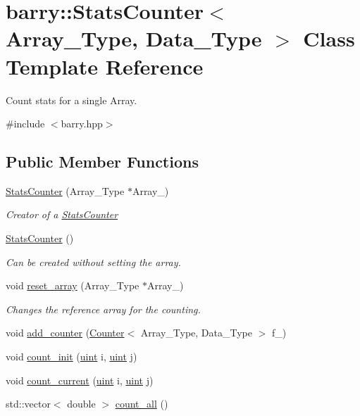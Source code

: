 \hypertarget{classbarry_1_1_stats_counter}{}\section{barry\+:\+:Stats\+Counter$<$ Array\+\_\+\+Type, Data\+\_\+\+Type $>$ Class Template Reference}
\label{classbarry_1_1_stats_counter}


Count stats for a single Array.  




{\ttfamily \#include $<$barry.\+hpp$>$}

\subsection*{Public Member Functions}
\begin{DoxyCompactItemize}
\item 
\hyperlink{classbarry_1_1_stats_counter_aab3d582ee9928340790bdd1b5b2d5f5b}{Stats\+Counter} (Array\+\_\+\+Type $\ast$Array\+\_\+)
\begin{DoxyCompactList}\small\item\em Creator of a {\ttfamily \hyperlink{classbarry_1_1_stats_counter}{Stats\+Counter}} \end{DoxyCompactList}\item 
\hyperlink{classbarry_1_1_stats_counter_a407df1580b207faac92c476c7062b840}{Stats\+Counter} ()
\begin{DoxyCompactList}\small\item\em Can be created without setting the array. \end{DoxyCompactList}\item 
void \hyperlink{classbarry_1_1_stats_counter_a38fd8037c34dff376d2e5fb013690642}{reset\+\_\+array} (Array\+\_\+\+Type $\ast$Array\+\_\+)
\begin{DoxyCompactList}\small\item\em Changes the reference array for the counting. \end{DoxyCompactList}\item 
void \hyperlink{classbarry_1_1_stats_counter_ad175dcd2bd30d017881783de546ac333}{add\+\_\+counter} (\hyperlink{classbarry_1_1_counter}{Counter}$<$ Array\+\_\+\+Type, Data\+\_\+\+Type $>$ f\+\_\+)
\item 
void \hyperlink{classbarry_1_1_stats_counter_a19bd5936619e190c0d8918b4f343922e}{count\+\_\+init} (\hyperlink{namespacebarry_a11dfc53ddb4672278319aa04f1e09a6c}{uint} i, \hyperlink{namespacebarry_a11dfc53ddb4672278319aa04f1e09a6c}{uint} j)
\item 
void \hyperlink{classbarry_1_1_stats_counter_ab81166f7cb67eeaecc469016d237019a}{count\+\_\+current} (\hyperlink{namespacebarry_a11dfc53ddb4672278319aa04f1e09a6c}{uint} i, \hyperlink{namespacebarry_a11dfc53ddb4672278319aa04f1e09a6c}{uint} j)
\item 
std\+::vector$<$ double $>$ \hyperlink{classbarry_1_1_stats_counter_a83bd92031a1499109c98f238221cbd67}{count\+\_\+all} ()
\end{DoxyCompactItemize}

